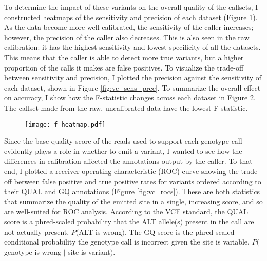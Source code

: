 To determine the impact of these variants on the overall quality of the callsets, I constructed heatmaps of the sensitivity and precision of each dataset (Figure \ref{fig:vc_sens_prech}). As the data become more well-calibrated, the sensitivity of the caller increases; however, the precision of the caller also decreases. This is also seen in the raw calibration: it has the highest sensitivity and lowest specificity of all the datasets. This means that the caller is able to detect more true variants, but a higher proportion of the calls it makes are false positives. To visualize the trade-off between sensitivity and precision, I plotted the precision against the sensitivity of each dataset, shown in Figure \ref{fig:vc_sens_prec}. To summarize the overall effect on accuracy, I show how the F-statistic changes across each dataset in Figure \ref{fig:vc_f_heatmap}. The callset made from the raw, uncalibrated data have the lowest F-statistic.

\begin{figure}
\centering
{}
\label{fig:vc_sens_prech}
\end{figure}

\begin{figure}
\centering
\texttt{[image: f\_heatmap.pdf]}
\label{fig:vc_f_heatmap}
\end{figure}

Since the base quality score of the reads used to support each genotype call evidently plays a role in whether to emit a variant, I wanted to see how the differences in calibration affected the annotations output by the caller. To that end, I plotted a receiver operating characteristic (ROC) curve showing the trade-off between false positive and true positive rates for variants ordered according to their QUAL and GQ annotations (Figure \ref{fig:vc_rocs}). These are both statistics that summarize the quality of the emitted site in a single, increasing score, and so are well-suited for ROC analysis. According to the VCF standard, the QUAL score is a phred-scaled probability that the ALT allele(s) present in the call are not actually present, $P($ALT is wrong$)$. The GQ score is the phred-scaled conditional probability the genotype call is incorrect given the site is variable, $P($genotype is wrong $|$ site is variant$)$.


